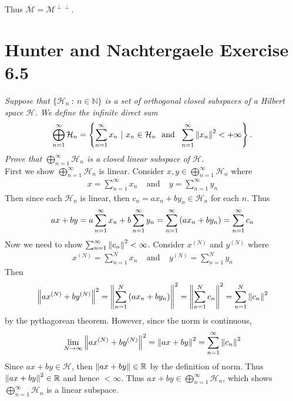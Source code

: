 \documentclass[12pt]{article}
\theoremstyle{plain}
\begin{document}
Thus $\overline{\mathcal{M}} = \mathcal{M}^{\perp\perp}$.

\section*{Hunter and Nachtergaele Exercise 6.5}
\emph{Suppose that $\{\mathcal{H}_n\ :\ n \in \mathbb{N}\}$ is a set of orthogonal closed subspaces of a Hilbert space $\mathcal{H}$.  We define the infinite direct sum $$\bigoplus_{n=1}^\infty \mathcal{H}_n = \left\{\sum_{n=1}^\infty x_n\ |\ x_n \in \mathcal{H}_n\ \text{ and }\ \sum_{n=1}^\infty \norm{x_n}^2 < + \infty\right\}.$$  Prove that $\bigoplus_{n=1}^\infty \mathcal{H}_n$ is a closed linear subspace of $\mathcal{H}$.} \\

First we show $\bigoplus_{n=1}^\infty \mathcal{H}_n$ is linear.  Consider $x, y \in \bigoplus_{n=1}^\infty \mathcal{H}_n$ where
\begin{align*}
    x = \sum_{n=1}^\infty x_n\ \ \ \ \ \text{and}\ \ \ \ \ y = \sum_{n=1}^\infty y_n
\end{align*}
Then since each $\mathcal{H}_n$ is linear, then $c_n = ax_n + by_n \in \mathcal{H}_n$ for each $n$.  Thus
\begin{align*}
    ax + by = a\sum_{n=1}^\infty x_n + b\sum_{n=1}^\infty y_n = \sum_{n=1}^\infty \qty(ax_n + by_n) = \sum_{n=1}^\infty c_n
\end{align*}
Now we need to show $\sum_{n=1}^\infty \norm{c_n}^2 < \infty$.  Consider $x^{(N)}$ and $y^{(N)}$ where
\begin{align*}
    x^{(N)} = \sum_{n=1}^N x_n\ \ \ \ \ \text{and}\ \ \ \ \ y^{(N)} = \sum_{n=1}^N y_n
\end{align*}
Then
\begin{align*}
    \norm{ax^{(N)} + by^{(N)}}^2 = \norm{\sum_{n=1}^N\qty(ax_n + by_n)}^2 = \norm{\sum_{n=1}^N c_n}^2 = \sum_{n=1}^N\norm{c_n}^2
\end{align*}
by the pythagorean theorem.  However, since the norm is continuous,
\begin{align*}
    \lim_{N\rightarrow\infty}\norm{ax^{(N)} + by^{(N)}}^2 = \norm{ax + by}^2 = \sum_{n=1}^\infty \norm{c_n}^2
\end{align*}
Since $ax + by \in \mathcal{H}$, then $\norm{ax + by} \in \mathbb{R}$ by the definition of norm.  Thus $\norm{ax + by}^2 \in \mathbb{R}$ and hence $< \infty$.  Thus $ax + by \in \bigoplus_{n=1}^\infty \mathcal{H}_n$, which shows $\bigoplus_{n=1}^\infty \mathcal{H}_n$ is a linear subspace.
\end{document}
